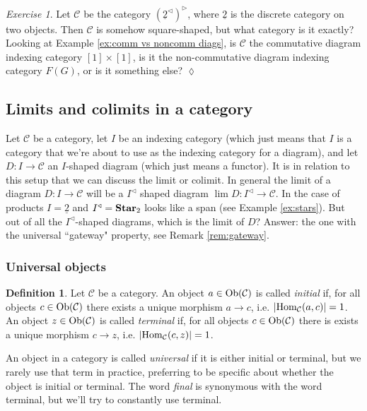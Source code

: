 \documentclass{book}
\def\tn{\textnormal}
\def\mc{\mathcal}
\def\Hom{\tn{Hom}}
\def\Ob{\tn{Ob}}
\def\lcone{^\triangleleft}
\def\rcone{^\triangleright}
\def\to{\rightarrow}
\def\taking{\colon}
\def\ul{\underline}
\def\Star{{\bf Star}}
\def\mcC{\mc{C}}
\theoremstyle{remark}
\newtheorem{exc}[subsubsection]{Exercise}
\newenvironment{exercise}{\begin{exc}}{\hspace*{\fill}$\lozenge$\end{exc}}
\theoremstyle{definition}
\newtheorem{definition}[subsubsection]{Definition}
\begin{document}
\begin{exercise}
Let $\mcC$ be the category $(\ul{2}\lcone)\rcone$, where $\ul{2}$ is the discrete category on two objects. Then $\mcC$ is somehow square-shaped, but what category is it exactly? Looking at Example \ref{ex:comm vs noncomm diags}, is $\mcC$ the commutative diagram indexing category $[1]\times[1]$, is it the non-commutative diagram indexing category $F(G)$, or is it something else?
\end{exercise}


\subsection{Limits and colimits in a category}\label{sec:lims and colims in a cat}

Let $\mcC$ be a category, let $I$ be an indexing category (which just means that $I$ is a category that we're about to use as the indexing category for a diagram), and let $D\taking I\to\mcC$ an $I$-shaped diagram (which just means a functor). It is in relation to this setup that we can discuss the limit or colimit. In general the limit of a diagram $D\taking I\to\mcC$ will be a $I\lcone$ shaped diagram $\lim D\taking I\lcone\to\mcC$. In the case of products $I=\ul{2}$ and $I\lcone=\Star_2$ looks like a span (see Example \ref{ex:stars}). But out of all the $I\lcone$-shaped diagrams, which is the limit of $D$? Answer: the one with the universal ``gateway" property, see Remark \ref{rem:gateway}.


\subsubsection{Universal objects}

\begin{definition}

Let $\mcC$ be a category. An object $a\in\Ob(\mcC)$ is called {\em initial} if, for all objects $c\in\Ob(\mcC)$ there exists a unique morphism $a\to c$, i.e. $|\Hom_\mcC(a,c)|=1$. An object $z\in\Ob(\mcC)$ is called {\em terminal} if, for all objects $c\in\Ob(\mcC)$ there is exists a unique morphism $c\to z$, i.e. $|\Hom_\mcC(c,z)|=1$. 

\end{definition}

An object in a category is called {\em universal} if it is either initial or terminal, but we rarely use that term in practice, preferring to be specific about whether the object is initial or terminal. The word {\em final} is synonymous with the word terminal, but we'll try to constantly use terminal. 
\end{document}
